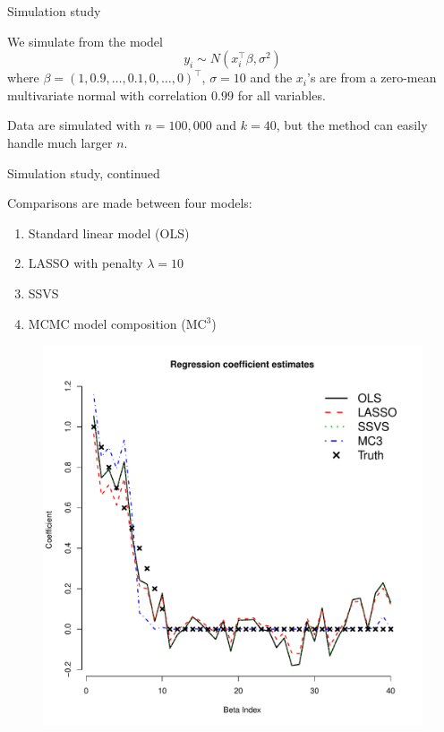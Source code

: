 \documentclass[mathserif, 11pt, t]{beamer}
\begin{document}
\begin{frame}{Simulation study}

We simulate from the model
\[ y_i \sim N(x_i^\top\beta, \sigma^2) \]
where $\beta=(1, 0.9, \ldots, 0.1, 0, \ldots, 0)^\top$, $\sigma=10$ and the $x_i$'s are from a zero-mean multivariate normal with correlation $0.99$ for all variables.
\bigskip

Data are simulated with $n=100,000$ and $k=40$, but the method can easily handle much larger $n$.

\end{frame}




\begin{frame}{Simulation study, continued}

Comparisons are made between four models:
\begin{enumerate}
\item Standard linear model (OLS)
\item LASSO with penalty $\lambda=10$
\item SSVS
\item MCMC model composition (MC$^3$)
\end{enumerate}

\end{frame}




\begin{frame}

\begin{figure}
\begin{center}
\includegraphics[scale=0.35]{figs/estimates.pdf}
\end{center}
\end{figure}

\end{frame}
\end{document}
